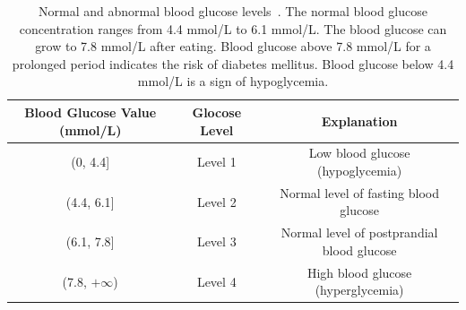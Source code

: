 
\begin{table}[h]
  \centering
  \caption{Normal and abnormal blood glucose levels~\cite{bib:BGWiKi}. The normal blood glucose concentration ranges from 4.4 mmol/L to 6.1 mmol/L. The blood glucose can grow to 7.8 mmol/L after eating. Blood glucose above 7.8 mmol/L for a prolonged period indicates the risk of diabetes mellitus. Blood glucose below 4.4 mmol/L is a sign of hypoglycemia.}
  \label{tab:blood_glucose_levels}
  \begin{tabular}{|c|c|c|}
  \hline
  \textbf{Blood Glucose Value (mmol/L)} & \textbf{Glocose Level} & \textbf{Explanation}                      \\ \hline
  (0, 4.4{]}                            & Level 1                & Low blood glucose (hypoglycemia)         \\ \hline
  (4.4, 6.1{]}                          & Level 2                & Normal level of fasting blood glucose      \\ \hline
  (6.1, 7.8{]}                          & Level 3                & Normal level of postprandial blood glucose \\ \hline
  (7.8, $+\infty$)                      & Level 4                & High blood glucose (hyperglycemia)          \\ \hline
  \end{tabular}
\end{table}





